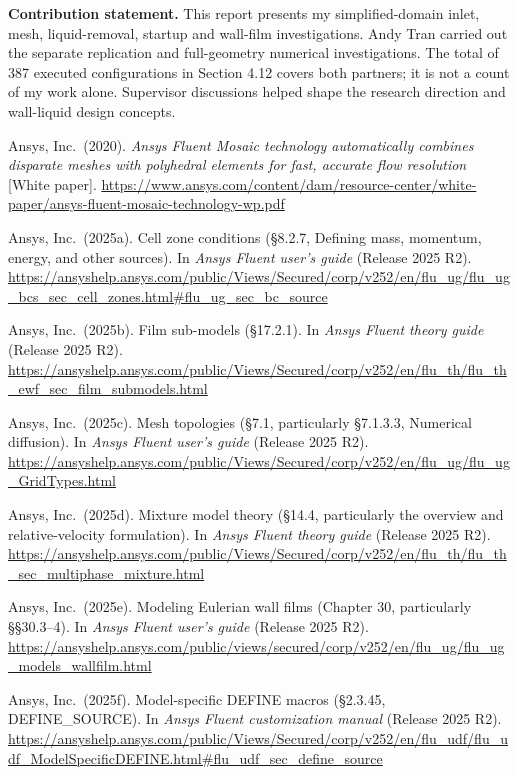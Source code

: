 \documentclass[12pt]{article}
\begin{document}
\textbf{Contribution statement.} This report presents my simplified-domain inlet, mesh, liquid-removal, startup and wall-film investigations. Andy Tran carried out the separate replication and full-geometry numerical investigations. The total of 387 executed configurations in Section 4.12 covers both partners; it is not a count of my work alone. Supervisor discussions helped shape the research direction and wall-liquid design concepts.

\clearpage{}\begingroup{}\setlength{\parskip}{3pt}\raggedright{}\setlength{\parindent}{-1.27cm}\setlength{\leftskip}{1.27cm}
Ansys, Inc.~(2020). \emph{Ansys Fluent Mosaic technology automatically combines disparate meshes with polyhedral elements for fast, accurate flow resolution} {[}White paper{]}. \url{https://www.ansys.com/content/dam/resource-center/white-paper/ansys-fluent-mosaic-technology-wp.pdf}

Ansys, Inc.~(2025a). Cell zone conditions (§8.2.7, Defining mass, momentum, energy, and other sources). In \emph{Ansys Fluent user's guide} (Release 2025 R2). \url{https://ansyshelp.ansys.com/public/Views/Secured/corp/v252/en/flu_ug/flu_ug_bcs_sec_cell_zones.html\#flu_ug_sec_bc_source}

Ansys, Inc.~(2025b). Film sub-models (§17.2.1). In \emph{Ansys Fluent theory guide} (Release 2025 R2). \url{https://ansyshelp.ansys.com/public/Views/Secured/corp/v252/en/flu_th/flu_th_ewf_sec_film_submodels.html}

Ansys, Inc.~(2025c). Mesh topologies (§7.1, particularly §7.1.3.3, Numerical diffusion). In \emph{Ansys Fluent user's guide} (Release 2025 R2). \url{https://ansyshelp.ansys.com/public/Views/Secured/corp/v252/en/flu_ug/flu_ug_GridTypes.html}

Ansys, Inc.~(2025d). Mixture model theory (§14.4, particularly the overview and relative-velocity formulation). In \emph{Ansys Fluent theory guide} (Release 2025 R2). \url{https://ansyshelp.ansys.com/public/Views/Secured/corp/v252/en/flu_th/flu_th_sec_multiphase_mixture.html}

Ansys, Inc.~(2025e). Modeling Eulerian wall films (Chapter 30, particularly §§30.3--4). In \emph{Ansys Fluent user's guide} (Release 2025 R2). \url{https://ansyshelp.ansys.com/public/views/secured/corp/v252/en/flu_ug/flu_ug_models_wallfilm.html}

Ansys, Inc.~(2025f). Model-specific DEFINE macros (§2.3.45, DEFINE\_SOURCE). In \emph{Ansys Fluent customization manual} (Release 2025 R2). \url{https://ansyshelp.ansys.com/public/Views/Secured/corp/v252/en/flu_udf/flu_udf_ModelSpecificDEFINE.html\#flu_udf_sec_define_source}
\end{document}
